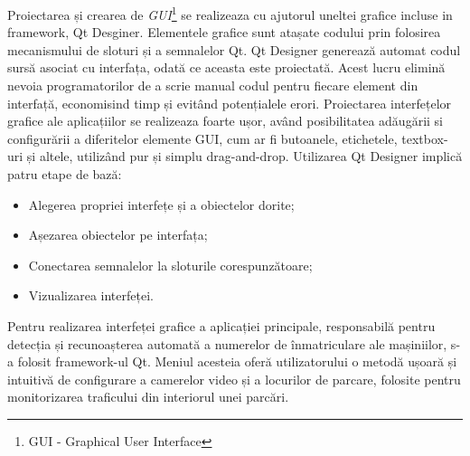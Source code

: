 \documentclass[12pt]{article}
\begin{document}
Proiectarea și crearea de \emph{GUI}\footnote{GUI - Graphical User Interface} se realizeaza cu ajutorul uneltei grafice incluse in framework, Qt Desginer. Elementele grafice sunt atașate codului prin folosirea mecanismului de sloturi și a semnalelor Qt. Qt Designer genereaz\u{a} automat codul surs\u{a} asociat cu interfața, odat\u{a} ce aceasta este proiectat\u{a}. Acest lucru elimin\u{a} nevoia programatorilor de a scrie manual codul pentru fiecare element din interfaț\u{a}, economisind timp și evit\^{a}nd potențialele erori. Proiectarea interfețelor grafice ale aplicațiilor se realizeaza foarte ușor, av\^{a}nd posibilitatea ad\u{a}ug\u{a}rii si configur\u{a}rii a diferitelor elemente GUI, cum ar fi butoanele, etichetele, textbox-uri și altele, utiliz\^{a}nd pur și simplu drag-and-drop. Utilizarea Qt Designer implic\u{a} patru etape de baz\u{a}:
\begin{itemize}
    \item Alegerea propriei interfețe și a obiectelor dorite;
    \item Așezarea obiectelor pe interfața;
    \item Conectarea semnalelor la sloturile corespunz\u{a}toare;
    \item Vizualizarea interfeței.
\end{itemize}

Pentru realizarea interfeței grafice a aplicației principale, responsabil\u{a} pentru detecția și recunoașterea automat\u{a} a numerelor de \^{i}nmatriculare ale mașiniilor, s-a folosit framework-ul Qt. Meniul acesteia ofer\u{a} utilizatorului o metod\u{a} ușoar\u{a} și intuitiv\u{a} de configurare a camerelor video și a locurilor de parcare, folosite pentru monitorizarea traficului din interiorul unei parc\u{a}ri.
\end{document}
